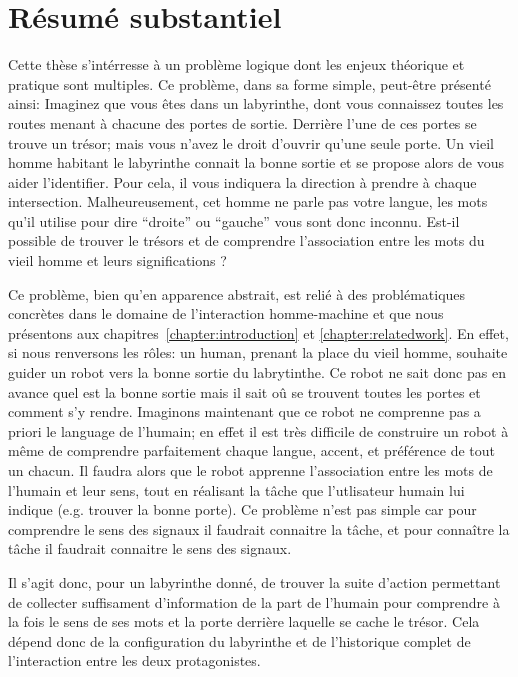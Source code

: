 
\chapter*{Résumé substantiel}
\label{chapter:frecnhresume}
\minitoc

Cette thèse s'intérresse à un problème logique dont les enjeux théorique et pratique sont multiples. Ce problème, dans sa forme simple, peut-être présenté ainsi: Imaginez que vous êtes dans un labyrinthe, dont vous connaissez toutes les routes menant à chacune des portes de sortie. Derrière l'une de ces portes se trouve un trésor; mais vous n'avez le droit d'ouvrir qu'une seule porte. Un vieil homme habitant le labyrinthe connait la bonne sortie et se propose alors de vous aider l'identifier. Pour cela, il vous indiquera la direction à prendre à chaque intersection. Malheureusement, cet homme ne parle pas votre langue, les mots qu'il utilise pour dire ``droite'' ou ``gauche'' vous sont donc inconnu. Est-il possible de trouver le trésors et de comprendre l'association entre les mots du vieil homme et leurs significations ?

Ce problème, bien qu'en apparence abstrait, est relié à des problématiques concrètes dans le domaine de l'interaction homme-machine et que nous présentons aux chapitres~\ref{chapter:introduction} et \ref{chapter:relatedwork}. En effet, si nous renversons les rôles: un human, prenant la place du vieil homme, souhaite guider un robot vers la bonne sortie du labrytinthe. Ce robot ne sait donc pas en avance quel est la bonne sortie mais il sait oû se trouvent toutes les portes et comment s'y rendre. Imaginons maintenant que ce robot ne comprenne pas a priori le language de l'humain; en effet il est très difficile de construire un robot à même de comprendre parfaitement chaque langue, accent, et préférence de tout un chacun. Il faudra alors que le robot apprenne l'association entre les mots de l'humain et leur sens, tout en réalisant la tâche que l'utlisateur humain lui indique (e.g. trouver la bonne porte). Ce problème n'est pas simple car pour comprendre le sens des signaux il faudrait connaitre la tâche, et pour connaître la tâche il faudrait connaitre le sens des signaux.

Il s'agit donc, pour un labyrinthe donné, de trouver la suite d'action permettant de collecter suffisament d'information de la part de l'humain pour comprendre à la fois le sens de ses mots et la porte derrière laquelle se cache le trésor. Cela dépend donc de la configuration du labyrinthe et de l'historique complet de l'interaction entre les deux protagonistes.

